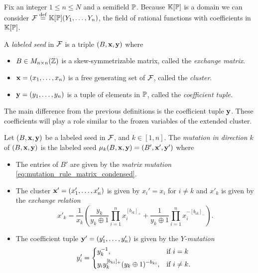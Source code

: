 Fix an integer $1 \leq n \leq N$ and a semifield $\mathbb{P}$. Because $\mathbb{K}[\mathbb{P}]$ is a
domain we can consider $\mathcal{F} \overset{\mathrm{def}}{=} \mathbb{K}[\mathbb{P}](Y_1, \dots, Y_n)$, the field of rational
functions with coefficients in $\mathbb{K}[\mathbb{P}]$.
\begin{definition}

	A \emph{labeled seed} in $\mathcal{F}$ is a triple $(B, \mathbf{x}, \mathbf{y})$ where
	\begin{itemize}
		\item $B \in M_{n \times n}(\mathbb{Z})$ is a skew-symmetrizable matrix, called the \emph{exchange matrix}.
		\item $\mathbf{x} = (x_1, \dots, x_n)$ is a free generating set of $\mathcal{F}$, called the \emph{cluster}.
		\item $\mathbf{y} = (y_1, \dots, y_n)$ is a tuple of elements in $\mathbb{P}$, called the \emph{coefficient tuple}.
	\end{itemize}
\end{definition}
%
The main difference from the previous definitions is the coefficient tuple $\mathbf{y}$. These
coefficients will play a role similar to the frozen variables of the extended cluster.

\begin{definition}
	Let $(B, \mathbf{x}, \mathbf{y})$ be a labeled seed in $\mathcal{F}$, and $k \in [1, n]$. The \emph{mutation in direction $k$} of $(B, \mathbf{x}, \mathbf{y})$ is the labeled seed $\mu_k(B, \mathbf{x}, \mathbf{y}) = (B', \mathbf{x}', \mathbf{y}')$ where
	\begin{itemize}
		\item The entries of $B'$ are given by the \emph{matrix mutation}
		      \cref{eq:mutation_rule_matrix_condensed}.
		\item The cluster $\mathbf{x}' = (x_1', \dots, x_n')$ is given by $x_i' = x_i$ for $i \neq k$ and
		      $x'_k$ is given by the \emph{exchange relation}
		      \begin{equation}\label{eq:exchange_relation_coefficients}
			      x'_k = \frac{1}{x_k}\left(\frac{y_k}{y_k \oplus 1} \prod_{i=1}^n x_i^{[b_{ik}]_{+}} + \frac{1}{y_k \oplus 1}\prod_{i=1}^n x_i^{-[b_{ik}]_{-}}\right).
		      \end{equation}
		\item The coefficient tuple $\mathbf{y}' = (y'_1, \dots, y'_n)$ is given by the
		      \emph{$Y$-mutation}
		      \begin{equation}\label{eq:Y_mutation}
			      y'_i = \begin{dcases*}
				      y_k\inv,                                        & if $i = k$     \\
				      y_i y_k^{[b_{ki}]_{+}}(y_k \oplus 1)^{-b_{ki}}, & if $i \neq k$.
			      \end{dcases*}
		      \end{equation}
	\end{itemize}
\end{definition}

